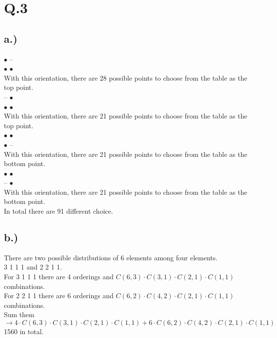 \documentclass[11pt]{article}
\begin{document}
\pagebreak 

\section*{Q.3}
\subsection*{a.)}

	$ \bullet $ --\\
	$ \bullet $   $ \bullet $  \\
	With this orientation, there are 28 possible points to choose from the table as the top point. \\
	-- $ \bullet $ \\
	$ \bullet $  $ \bullet $ \\
	With this orientation, there are 21 possible points to choose from the table as the top point. \\
	$ \bullet $  $ \bullet $ \\
	$ \bullet $ -- \\
	With this orientation, there are 21 possible points to choose from the table as the bottom point. \\
	$ \bullet $  $ \bullet $ \\
	-- $ \bullet $ \\
	With this orientation, there are 21 possible points to choose from the table as the bottom point. \\
	In total there are 91 different choice. \\


\subsection*{b.)}

	There are two possible distributions of 6 elements among four elements. \\
	3 1 1 1   and   2 2 1 1. \\
	For 3 1 1 1 there are 4 orderings and $ C(6, 3) \cdot C(3, 1) \cdot C(2, 1) \cdot C(1, 1) $ combinations. \\
	For 2 2 1 1 there are 6 orderings and $ C(6, 2) \cdot C(4, 2) \cdot C(2, 1) \cdot C(1, 1) $ combinations. \\
	Sum them $ \rightarrow 4 \cdot C(6, 3) \cdot C(3, 1) \cdot C(2, 1) \cdot C(1, 1) + 6 \cdot C(6, 2) \cdot C(4, 2) \cdot C(2, 1) \cdot C(1, 1)$ \\
	1560 in total.  \\
 
\end{document}
